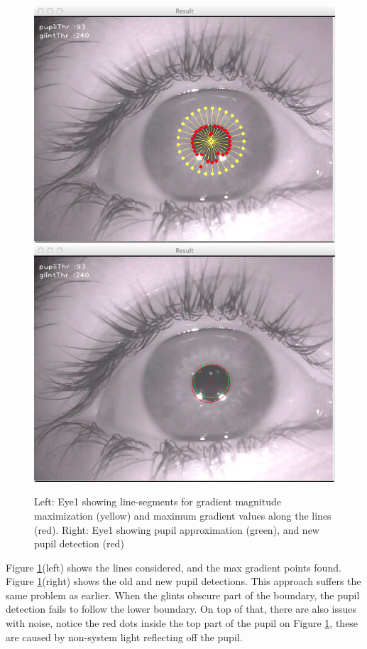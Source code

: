 \documentclass[a4paper,11pt]{article}
\begin{document}
\begin{figure}[H]
  \centering
  \includegraphics[scale=0.25]{gradient_circle}
  \includegraphics[scale=0.25]{gradient_pupil}
  \caption{Left: Eye1 showing line-segments for gradient magnitude maximization (yellow) and maximum gradient values along the lines (red). Right: Eye1 showing pupil approximation (green), and new pupil detection (red)}
  \label{fig:gradient_circle}
\end{figure}

Figure \ref{fig:gradient_circle}(left) shows the lines considered, and the max gradient points found. Figure \ref{fig:gradient_circle}(right) shows the old and new pupil detections. This approach suffers the same problem as earlier. When the glints obscure part of the boundary, the pupil detection fails to follow the lower boundary. On top of that, there are also issues with noise, notice the red dots inside the top part of the pupil on Figure \ref{fig:gradient_circle}, these are caused by non-system light reflecting off the pupil.
\end{document}
